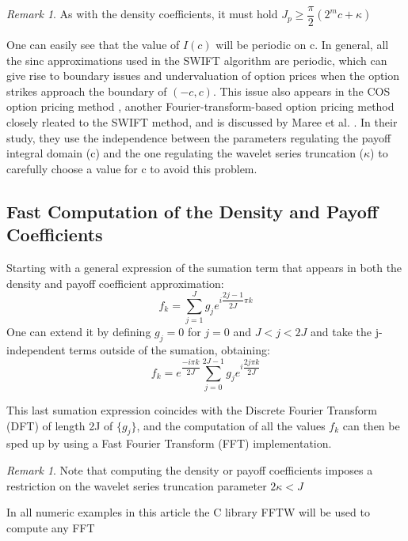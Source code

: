 \documentclass[12,twoside]{mammeTFM}
\theoremstyle{definition}
\theoremstyle{remark}
\newtheorem{remark}[thm]{Remark}
\begin{document}
\begin{remark}
As with the density coefficients, it must hold $J_p \geq \dfrac{\pi}{2}(2^m c + \kappa)$
\end{remark}

One can easily see that the value of $I(c)$ will be periodic on c. In general, all the sinc approximations used in the SWIFT algorithm are periodic, which can give rise to boundary issues and undervaluation of option prices when the option strikes approach the boundary of $(-c, c)$. This issue also appears in the COS option pricing method \cite{Fang2008}, another Fourier-transform-based option pricing method closely rleated to the SWIFT method, and is discussed by Maree et al. \cite{mar17}. In their study, they use the independence between the parameters regulating the payoff integral domain (c) and the one regulating the wavelet series truncation ($\kappa$) to carefully choose a value for c to avoid this problem.

\subsection{Fast Computation of the Density and Payoff Coefficients} \label{subsec:fft}
Starting with a general expression of the sumation term that appears in both the density and payoff coefficient approximation:
\begin{equation}
f_k = \sum_{j=1}^J g_j e^{i \dfrac{2j - 1}{2J}\pi k}
\end{equation}
One can extend it by defining $g_j = 0$ for $j = 0$ and $J < j < 2J$ and take the j-independent terms outside of the sumation, obtaining:
\begin{equation}
f_k = e^{\dfrac{-i \pi k}{2J}}\sum_{j=0}^{2J - 1} g_j e^{i \dfrac{2j\pi k}{2J}}
\end{equation}

This last sumation expression coincides with the Discrete Fourier Transform (DFT) of length 2J of $\{g_j\}$, and the computation of all the values $f_k$ can then be sped up by using a Fast Fourier Transform (FFT) implementation. 

\begin{remark}
Note that computing the density or payoff coefficients imposes a restriction on the wavelet series truncation parameter $2 \kappa < J$
\end{remark}

In all numeric examples in this article the C library FFTW will be used to compute any FFT \cite{fftw3}
\end{document}
